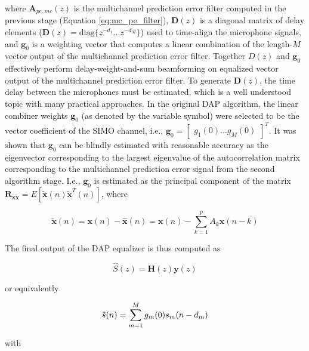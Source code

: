 \noindent
where $\boldsymbol{A}_{pe,mc}(z)$ is the multichannel prediction error filter computed in the previous stage (Equation \ref{eq:mc_pe_filter}), $\boldsymbol{D}(z)$ is a diagonal matrix of delay elements ($\boldsymbol{D}(z) = \mathrm{diag} \{z^{-d_1} \dots z^{-d_M}\}$) used to time-align the microphone signals, and $\boldsymbol{g}_0$ is a weighting vector that computes a linear combination of the length-$M$ vector output of the multichannel prediction error filter. Together $D(z)$ and $\boldsymbol{g}_0$ effectively perform delay-weight-and-sum beamforming on equalized vector output of the multichannel prediction error filter. To generate $\boldsymbol{D}(z)$, the time delay between the microphones must be estimated, which is a well understood topic with many practical approaches. In the original DAP algorithm, the linear combiner weights $\boldsymbol{g}_0$ (as denoted by the variable symbol) were selected to be the vector coefficient of the SIMO channel, i.e., $\boldsymbol{g}_0 = \begin{bmatrix} g_1(0) \dots g_M(0) \end{bmatrix} ^T$. It was shown that $\boldsymbol{g}_0$ can be blindly estimated with reasonable accuracy as the eigenvector corresponding to the largest eigenvalue of the autocorrelation matrix corresponding to the multichannel prediction error signal from the second algorithm stage. I.e., $\boldsymbol{g}_0$ is estimated as the principal component of the matrix $\boldsymbol{R}_{\tilde{\boldsymbol{x}} \tilde{\boldsymbol{x}}} = E[ \tilde{\boldsymbol{x}}(n) \tilde{\boldsymbol{x}}^T(n) ]$, where

\begin{equation}
	\tilde{\boldsymbol{x}}(n) = \boldsymbol{x}(n) - \hat{\boldsymbol{x}}(n) = \boldsymbol{x}(n) - \sum_{k=1}^{p} A_k \boldsymbol{x}(n-k)
\end{equation}

The final output of the DAP equalizer is thus computed as 

\begin{equation}
	\hat{S}(z) = \boldsymbol{H}(z) \boldsymbol{y}(z)  \label{eq:dap_eq_output}
\end{equation}

\noindent
or equivalently

\begin{equation}
	\hat{s}(n) = \sum_{m=1}^{M} g_m(0) s_m(n-d_m) \\
\end{equation}

\noindent 
with

